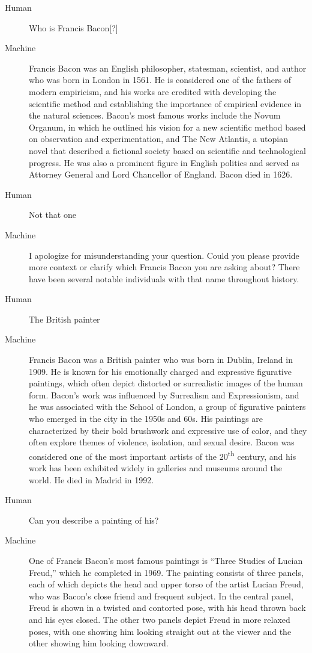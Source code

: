 \begin{description}
\item[Human] Who is Francis Bacon[?]
\item[Machine] Francis Bacon was an English philosopher, statesman, scientist,
    and author who was born in London in 1561. He is considered one of the
    fathers of modern empiricism, and his works are credited with developing the
    scientific method and establishing the importance of empirical evidence in
    the natural sciences. Bacon's most famous works include the Novum Organum,
    in which he outlined his vision for a new scientific method based on
    observation and experimentation, and The New Atlantis, a utopian novel that
    described a fictional society based on scientific and technological
    progress. He was also a prominent figure in English politics and served as
    Attorney General and Lord Chancellor of England. Bacon died in 1626.
\item[Human] Not that one
\item[Machine] I apologize for misunderstanding your question. Could you please
    provide more context or clarify which Francis Bacon you are asking about?
    There have been several notable individuals with that name throughout
    history.
\item[Human] The British painter
\item[Machine] Francis Bacon was a British painter who was born in Dublin,
    Ireland in 1909. He is known for his emotionally charged and expressive
    figurative paintings, which often depict distorted or surrealistic images of
    the human form. Bacon's work was influenced by Surrealism and Expressionism,
    and he was associated with the School of London, a group of figurative
    painters who emerged in the city in the 1950s and 60s. His paintings are
    characterized by their bold brushwork and expressive use of color, and they
    often explore themes of violence, isolation, and sexual desire. Bacon was
    considered one of the most important artists of the 20\textsuperscript{th}
    century, and his work has been exhibited widely in galleries and museums
    around the world. He died in Madrid in 1992.
\item[Human] Can you describe a painting of his?
\item[Machine] One of Francis Bacon's most famous paintings is ``Three Studies
    of Lucian Freud,'' which he completed in 1969. The painting consists of
    three panels, each of which depicts the head and upper torso of the artist
    Lucian Freud, who was Bacon's close friend and frequent subject. In the
    central panel, Freud is shown in a twisted and contorted pose, with his head
    thrown back and his eyes closed. The other two panels depict Freud in more
    relaxed poses, with one showing him looking straight out at the viewer and
    the other showing him looking downward.


\end{description}
